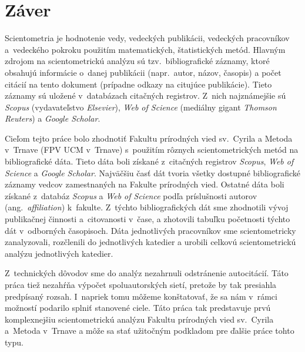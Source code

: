 \chapter*{Záver}

Scientometria je hodnotenie vedy, vedeckých publikácii, vedeckých pracovníkov
a~vedeckého pokroku použitím matematických, štatistických metód.  Hlavným zdrojom
na scientometrickú analýzu sú tzv.~bibliografické záznamy, ktoré obsahujú
informácie o~danej publikácii (napr.~autor, názov, časopis) a počet citácií na
tento dokument (prípadne odkazy na citujúce publikácie).  Tieto záznamy sú
uložené v~databázach citačných registrov.  Z~nich najznámejšie sú \emph{Scopus}
(vydavateľstvo \emph{Elsevier}), \emph{Web of Science} (mediálny gigant
\emph{Thomson Reuters}) a \emph{Google Scholar}.

Cieľom tejto práce bolo zhodnotiť Fakultu prírodných vied sv.~Cyrila a Metoda
v~Trnave (FPV UCM v~Trnave) s~použitím rôznych scientometrických metód na
bibliografické dáta.  Tieto dáta boli získané z~citačných registrov
\emph{Scopus}, \emph{Web of Science} a \emph{Google Scholar}.  Najväčšiu časť
dát tvoria všetky dostupné bibliografické záznamy vedcov zamestnaných na Fakulte
prírodných vied.  Ostatné dáta boli získané z~databáz \emph{Scopus} a \emph{Web
  of Science} podľa príslušnosti autorov (ang.~\emph{affiliation}) k~fakulte.
Z~týchto bibliografických dát sme zhodnotili vývoj publikačnej činnosti
a~citovanosti v~čase, a zhotovili tabuľku početnosti týchto dát v~odborných
časopisoch.  Dáta jednotlivých pracovníkov sme scientometricky zanalyzovali,
rozčlenili do jednotlivých katedier a urobili celkovú scientometrickú analýzu
jednotlivých katedier.

Z~technických dôvodov sme do analýz nezahrnuli odstránenie autocitácií.  Táto
práca tiež nezahŕňa výpočet spoluautorských sietí, pretože by tak presiahla
predpísaný rozsah.  I~napriek tomu môžeme konštatovať, že sa nám v~rámci
možností podarilo splniť stanovené ciele.  Táto práca tak predstavuje prvú
komplexnejšiu scientometrickú analýzu Fakultu prírodných vied sv.~Cyrila
a~Metoda v~Trnave a môže sa stať užitočným podkladom pre ďalšie práce tohto typu.

